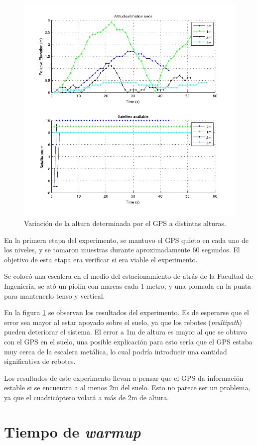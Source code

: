 \documentclass[main]{subfiles}
\begin{document}
\begin{figure}
\vspace{-30pt}
  \begin{center}
  \includegraphics[width=.5\textwidth]{./pics_gps/altura_punto_fijo_fing.png}
  \end{center}
\vspace{-25pt}
  \caption{Variación de la altura determinada por el GPS a distintas alturas.}
  \label{fig:altura_punto_fijo_fing.png}
\vspace{-15pt}
\end{figure}

En la primera etapa del experimento, se mantuvo el GPS quieto en cada uno de los niveles, y se tomaron muestras durante aproximadamente 60 segundos. El objetivo de esta etapa era verificar si era viable el experimento.

Se colocó una escalera en el medio del estacionamiento de atrás de la Facultad de Ingeniería, se ató un piolín con marcas cada 1 metro, y una plomada en la punta para mantenerlo tenso y vertical.

En la figura \ref{fig:altura_punto_fijo_fing.png} se observan los resultados del experimento. Es de esperarse que el error sea mayor al estar apoyado sobre el suelo, ya que los rebotes (\textit{multipath}) pueden deteriorar el sistema. El error a 1m de altura es mayor al que se obtuvo con el GPS en el suelo, una posible explicación para esto sería que el GPS estaba muy cerca de la escalera metálica, lo cual podría introducir una cantidad significativa de rebotes.

Los resultados de este experimento llevan a pensar que el GPS da información estable si se encuentra a al menos 2m del suelo. Esto no parece ser un problema, ya que el cuadricóptero volará a más de 2m de altura.

\section{Tiempo de \textit{warmup}}
\label{sec:tiempo-de-warmup}
\end{document}

